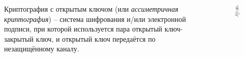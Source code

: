 \documentclass[presentation]{beamer}
\begin{document}
\begin{frame}{}
  \begin{columns}
    \begin{column}{0.7\textwidth}
      \raisebox{-.30em}{\Large\HandRight}\hspace{.25em} Криптография с
      открытым ключом (или \textit{ассиметричная криптография}) -- система
      шифрования и/или электронной подписи, при которой используется пара
      открытый ключ-закрытый ключ, и открытый ключ передаётся по
      незащищённому каналу.
    \end{column}
    \begin{column}{0.3\textwidth}
      \begin{figure}[htb]
        \centering
        \includegraphics[height=0.8\textheight]{keys}
      \end{figure}
    \end{column}
  \end{columns}
\end{frame}
\end{document}
